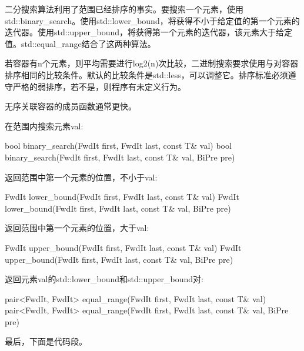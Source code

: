二分搜索算法利用了范围已经排序的事实。要搜索一个元素，使用std::binary\_search。使用std::lower\_bound，将获得不小于给定值的第一个元素的迭代器。使用std::upper\_bound，将获得第一个元素的迭代器，该元素大于给定值。std::equal\_range结合了这两种算法。

若容器有n个元素，则平均需要进行log2(n)次比较，二进制搜索要求使用与对容器排序相同的比较条件。默认的比较条件是std::less，可以调整它。排序标准必须遵守严格的弱排序，若不是，则程序有未定义行为。

无序关联容器的成员函数通常更快。

在范围内搜索元素val:

\begin{cpp}
bool binary_search(FwdIt first, FwdIt last, const T& val)
bool binary_search(FwdIt first, FwdIt last, const T& val, BiPre pre)
\end{cpp}

返回范围中第一个元素的位置，不小于val:

\begin{cpp}
FwdIt lower_bound(FwdIt first, FwdIt last, const T& val)
FwdIt lower_bound(FwdIt first, FwdIt last, const T& val, BiPre pre)
\end{cpp}

返回范围中第一个元素的位置，大于val:

\begin{cpp}
FwdIt upper_bound(FwdIt first, FwdIt last, const T& val)
FwdIt upper_bound(FwdIt first, FwdIt last, const T& val, BiPre pre)
\end{cpp}

返回元素val的std::lower\_bound和std::upper\_bound对:

\begin{cpp}
pair<FwdIt, FwdIt> equal_range(FwdIt first, FwdIt last, const T& val)
pair<FwdIt, FwdIt> equal_range(FwdIt first, FwdIt last, const T& val, BiPre pre)
\end{cpp}

最后，下面是代码段。


